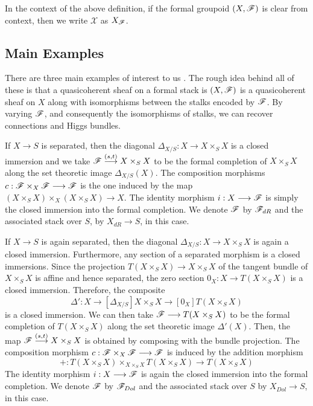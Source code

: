 \documentclass[11pt]{amsart}
\begin{document}
\begin{notn}
In the context of the above definition, if the formal groupoid $(X, \mathscr{F})$
is clear from context, then we write $\mathcal{X}$ as $X_\mathscr{F}$.
\end{notn}

\subsection{Main Examples}

There are three main examples of interest to us \cite[31---33]{NonAbHodgeFilt}.
The rough idea behind all of these is that a quasicoherent sheaf on
a formal stack is $(X, \mathscr{F})$ is a quasicoherent sheaf on $X$ along with
isomorphisms between the stalks encoded by $\mathscr{F}$. By varying $\mathscr{F}$,
and consequently the isomorphisms of stalks, we can recover connections and
Higgs bundles.

\begin{exm}
\label{exm:dR-st}
If $X \to S$ is separated, then the diagonal $\Delta_{X/S} : X \to X \times_S X$
is a closed immersion and we take $\sF \to[{(s, t)}] X \times_S X$ to be the
formal completion of $X \times_S X$ along the set theoretic image
$\Delta_{X/S}(X)$. The composition morphisms $c : \sF \times_X \sF \to \sF$
is the one induced by the map 
$(X \times_S X) \times_X (X \times_S X) \to X$.
The identity morphism $i : X \to \sF$
is simply the closed immersion into the formal completion.
We denote $\mathscr{F}$ by $\mathscr{F}_{dR}$ and the associated stack over $S$, by
$X_{dR} \to S$, in this case.
\end{exm}

\begin{exm}
\label{exm:Dol-st}
If $X \to S$ is again separated, then the diagonal
$\Delta_{X/S} : X \to X \times_S X$ is again a closed immersion. Furthermore,
any section of a separated morphism is a closed immersions. Since the
projection $T(X \times_S X) \to X \times_S X$ of the tangent bundle of
$X \times_S X$ is affine and hence separated, the zero section
$0_X : X \to T(X \times_S X)$ is a closed immersion. Therefore, the composite
\[
\Delta' : X \to[\Delta_{X/S}] X \times_S X \to[0_X] T(X \times_S X)
\]
is a closed immersion.
We can then take $\sF \to T(X \times_S X)$ to be the
formal completion of $T(X \times_S X)$ along the set theoretic image
$\Delta'(X)$.
Then, the map $\sF \to[{(s, t)}] X \times_S X$ is obtained by
composing with the bundle projection.
The composition morphism $c : \sF \times_X \sF \to \sF$ is induced by
the addition morphism 
\[
+ : T(X \times_S X) \times_{X \times_S X} T(X \times_S X) \to T(X \times_S X)
\]
The identity morphism $i : X \to \sF$
is again the closed immersion into the formal completion.
We denote $\mathscr{F}$ by $\mathscr{F}_{Dol}$ and the associated stack over $S$ by
$X_{Dol} \to S$, in this case.
\end{exm}
\end{document}
